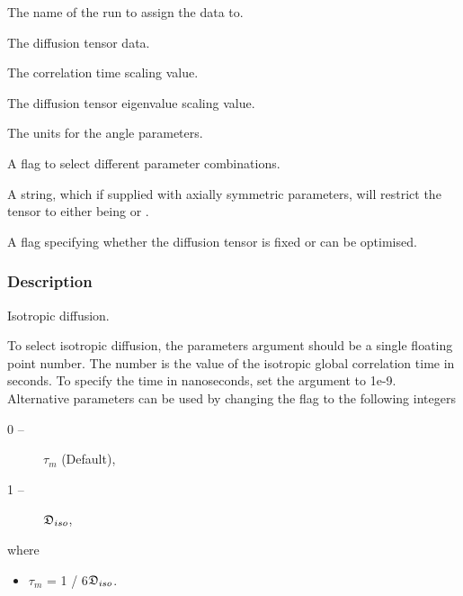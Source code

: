   The name of the run to assign the data to. 

  The diffusion tensor data. 

  The correlation time scaling value. 

  The diffusion tensor eigenvalue scaling value. 

  The units for the angle parameters. 

  A flag to select different parameter combinations. 

  A string, which if supplied with axially symmetric parameters, will restrict the tensor to either being  or . 

  A flag specifying whether the diffusion tensor is fixed or can be optimised. 




\subsubsection{Description}

Isotropic diffusion.


To select isotropic diffusion, the parameters argument should be a single floating point number.  The number is the value of the isotropic global correlation time in seconds.  To specify the time in nanoseconds, set the  argument to 1e-9.  Alternative parameters can be used by changing the  flag to the following integers


\begin{description}
\item[0 --]  $\tau_m$   (Default), 
\item[1 --]  $\mathfrak{D}_{iso}$, 
\end{description}


where


\begin{itemize}
\item[] $\tau_m$ = 1 / 6$\mathfrak{D}_{iso}$. 
\end{itemize}


